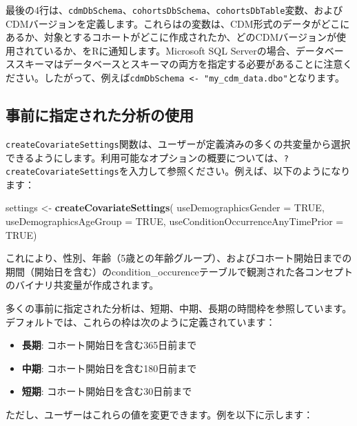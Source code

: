 \documentclass[
  11pt]{book}
\newenvironment{Shaded}{\begin{snugshade}}{\end{snugshade}}
\newcommand{\AttributeTok}[1]{\textcolor[rgb]{0.13,0.29,0.53}{#1}}
\newcommand{\ConstantTok}[1]{\textcolor[rgb]{0.56,0.35,0.01}{#1}}
\newcommand{\FunctionTok}[1]{\textcolor[rgb]{0.13,0.29,0.53}{\textbf{#1}}}
\newcommand{\NormalTok}[1]{#1}
\newcommand{\OtherTok}[1]{\textcolor[rgb]{0.56,0.35,0.01}{#1}}
\providecommand{\tightlist}{%
  \setlength{\itemsep}{0pt}\setlength{\parskip}{0pt}}
\theoremstyle{definition}
\theoremstyle{definition}
\theoremstyle{definition}
\theoremstyle{definition}
\theoremstyle{remark}
\begin{document}
最後の4行は、\texttt{cdmDbSchema}、\texttt{cohortsDbSchema}、\texttt{cohortsDbTable}変数、およびCDMバージョンを定義します。これらはの変数は、CDM形式のデータがどこにあるか、対象とするコホートがどこに作成されたか、どのCDMバージョンが使用されているか、をRに通知します。Microsoft SQL Serverの場合、データベーススキーマはデータベースとスキーマの両方を指定する必要があることに注意ください。したがって、例えば\texttt{cdmDbSchema\ \textless{}-\ "my\_cdm\_data.dbo"}となります。

\subsection{事前に指定された分析の使用}\label{ux4e8bux524dux306bux6307ux5b9aux3055ux308cux305fux5206ux6790ux306eux4f7fux7528}

\texttt{createCovariateSettings}関数は、ユーザーが定義済みの多くの共変量から選択できるようにします。利用可能なオプションの概要については、\texttt{?createCovariateSettings}を入力して参照ください。例えば、以下のようになります：

\begin{Shaded}
\begin{Highlighting}[]
\NormalTok{settings }\OtherTok{\textless{}{-}} \FunctionTok{createCovariateSettings}\NormalTok{(}
  \AttributeTok{useDemographicsGender =} \ConstantTok{TRUE}\NormalTok{,}
  \AttributeTok{useDemographicsAgeGroup =} \ConstantTok{TRUE}\NormalTok{,}
  \AttributeTok{useConditionOccurrenceAnyTimePrior =} \ConstantTok{TRUE}\NormalTok{)}
\end{Highlighting}
\end{Shaded}

これにより、性別、年齢（5歳との年齢グループ）、およびコホート開始日までの期間（開始日を含む）のcondition\_occurenceテーブルで観測された各コンセプトのバイナリ共変量が作成されます。

多くの事前に指定された分析は、短期、中期、長期の時間枠を参照しています。デフォルトでは、これらの枠は次のように定義されています：

\begin{itemize}
\tightlist
\item
  \textbf{長期}: コホート開始日を含む365日前まで
\item
  \textbf{中期}: コホート開始日を含む180日前まで
\item
  \textbf{短期}: コホート開始日を含む30日前まで
\end{itemize}

ただし、ユーザーはこれらの値を変更できます。例を以下に示します：
\end{document}
